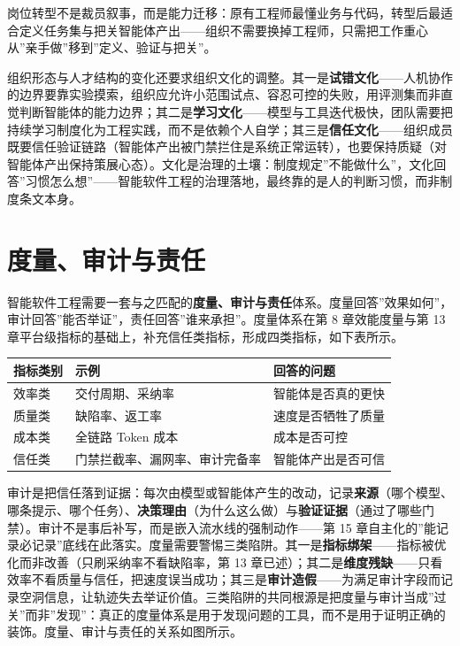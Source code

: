 \documentclass[12pt,a4paper,twoside,openany]{ctexbook}
\numberwithin{figure}{chapter}
\numberwithin{table}{chapter}
\newcounter{none}
\begin{document}
岗位转型不是裁员叙事，而是能力迁移：原有工程师最懂业务与代码，转型后最适合定义任务集与把关智能体产出------组织不需要换掉工程师，只需把工作重心从''亲手做''移到''定义、验证与把关''。

组织形态与人才结构的变化还要求组织文化的调整。其一是\textbf{试错文化}------人机协作的边界要靠实验摸索，组织应允许小范围试点、容忍可控的失败，用评测集而非直觉判断智能体的能力边界；其二是\textbf{学习文化}------模型与工具迭代极快，团队需要把持续学习制度化为工程实践，而不是依赖个人自学；其三是\textbf{信任文化}------组织成员既要信任验证链路（智能体产出被门禁拦住是系统正常运转），也要保持质疑（对智能体产出保持策展心态）。文化是治理的土壤：制度规定''不能做什么''，文化回答''习惯怎么想''------智能软件工程的治理落地，最终靠的是人的判断习惯，而非制度条文本身。

\section{度量、审计与责任}\label{ux5ea6ux91cfux5ba1ux8ba1ux4e0eux8d23ux4efb}

智能软件工程需要一套与之匹配的\textbf{度量、审计与责任}体系。度量回答''效果如何''，审计回答''能否举证''，责任回答''谁来承担''。度量体系在第
8 章效能度量与第 13
章平台级指标的基础上，补充信任类指标，形成四类指标，如下表所示。

{\def\LTcaptype{none} %
\begin{longtable}[]{@{}lll@{}}
\toprule\noalign{}
指标类别 & 示例 & 回答的问题 \\
\midrule\noalign{}
\endhead
\bottomrule\noalign{}
\endlastfoot
效率类 & 交付周期、采纳率 & 智能体是否真的更快 \\
质量类 & 缺陷率、返工率 & 速度是否牺牲了质量 \\
成本类 & 全链路 Token 成本 & 成本是否可控 \\
信任类 & 门禁拦截率、漏网率、审计完备率 & 智能体产出是否可信 \\
\end{longtable}
}

审计是把信任落到证据：每次由模型或智能体产生的改动，记录\textbf{来源}（哪个模型、哪条提示、哪个任务）、\textbf{决策理由}（为什么这么做）与\textbf{验证证据}（通过了哪些门禁）。审计不是事后补写，而是嵌入流水线的强制动作------第
15
章自主化的''能记录必记录''底线在此落实。度量需要警惕三类陷阱。其一是\textbf{指标绑架}------指标被优化而非改善（只刷采纳率不看缺陷率，第
13
章已述）；其二是\textbf{维度残缺}------只看效率不看质量与信任，把速度误当成功；其三是\textbf{审计造假}------为满足审计字段而记录空洞信息，让轨迹失去举证价值。三类陷阱的共同根源是把度量与审计当成''过关''而非''发现''：真正的度量体系是用于发现问题的工具，而不是用于证明正确的装饰。度量、审计与责任的关系如图所示。
\end{document}
